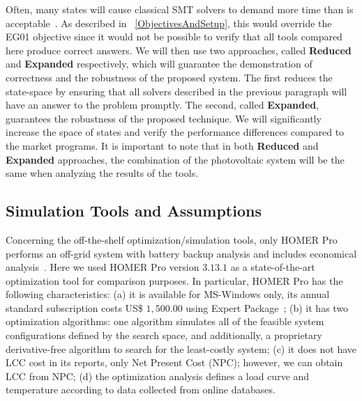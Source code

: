 \documentclass[10pt,journal,compsoc]{IEEEtran}
\begin{document}
Often, many states will cause classical SMT solvers to demand more time than is acceptable~\cite{abs-1909-13139}. As described in ~\ref{ObjectivesAndSetup}, this would override the EG01 objective since it would not be possible to verify that all tools compared here produce correct answers. We will then use two approaches, called \textbf{Reduced} and \textbf{Expanded} respectively, which will guarantee the demonstration of correctness and the robustness of the proposed system. The first reduces the state-space by ensuring that all solvers described in the previous paragraph will have an answer to the problem promptly. The second, called \textbf{Expanded}, guarantees the robustness of the proposed technique. We will significantly increase the space of states and verify the performance differences compared to the market programs. It is important to note that in both \textbf{Reduced} and \textbf{Expanded} approaches, the combination of the photovoltaic system will be the same when analyzing the results of the tools.


\subsection{Simulation Tools and Assumptions}
\label{sec:SimulationToolsandAssumptions}

Concerning the off-the-shelf optimization/simulation tools, only HOMER Pro performs an off-grid system with battery backup analysis and includes economical analysis~\cite{Pradhan,Swarnkar}. Here we used HOMER Pro version $3.13.1$ as a state-of-the-art optimization tool for comparison purposes. In particular, HOMER Pro has the following characteristics:
%
(a) it is available for MS-Windows only, its annual standard subscription costs US\$ $1,500.00$ using Expert Package~\cite{HOMER};
(b) it has two optimization algorithms: one algorithm simulates all of the feasible system configurations defined by the search space, and additionally, a proprietary derivative-free algorithm to search for the least-costly system;
(c) it does not have LCC cost in its reports, only Net Present Cost (NPC); however, we can obtain LCC from NPC; 
(d) the optimization analysis defines a load curve and temperature according to data collected from online databases. 
\end{document}
